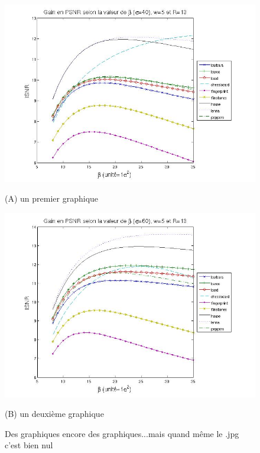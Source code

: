 \medskip
\begin{figure}[htb]
\begin{minipage}[b]{0.48\linewidth}
  \centering
 \centerline{\includegraphics[width=1.44\textwidth]{srcimages/psnr_sig40}}
  \vspace{0.1cm}
  \centerline{(A) un premier graphique }\medskip
\end{minipage}
\hfill
\begin{minipage}[b]{.48\linewidth}
  \centering
 \centerline{\includegraphics[width=1.44\textwidth]{srcimages/psnr_sig60}}
  \vspace{0.1cm}
  \centerline{(B) un deuxième graphique}\medskip
\end{minipage}%

\caption{Des graphiques encore des graphiques...mais quand m\^eme le .jpg c'est bien nul	}
\label{fig:ma_figure}
\end{figure}

